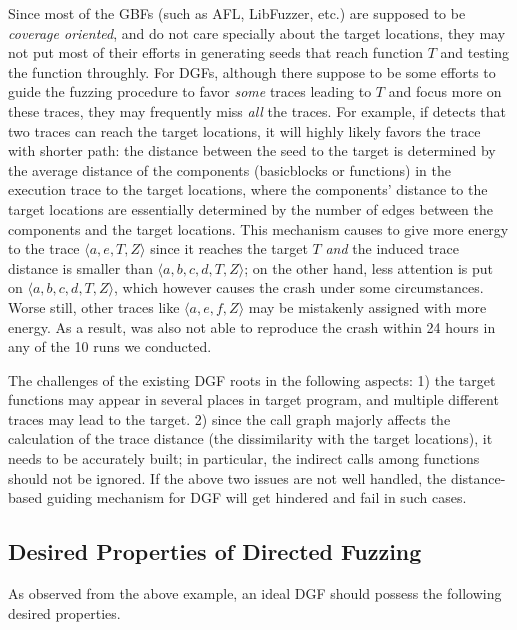 Since most of the GBFs (such as AFL, LibFuzzer, etc.) are supposed to be \emph{coverage oriented}, and do not care specially about the target locations, they may not put most of their efforts in generating seeds that reach function $T$ and testing the function throughly. For DGFs, although there suppose to be some efforts to guide the fuzzing procedure to favor \emph{some} traces leading to $T$ and focus more on these traces, they may frequently miss \emph{all} the traces. For example, if \aflgo detects that two traces can reach the target locations, it will highly likely favors the trace with shorter path: the distance between the seed to the target is determined by the average distance of the components (basicblocks or functions) in the execution trace to the target locations, where the components' distance to the target locations are essentially determined by the number of edges between the components and the target locations. This mechanism causes \aflgo to give more energy to the trace $\langle a, e, T, Z\rangle$ since it reaches the target $T$ \emph{and} the induced trace distance is smaller than $\langle a, b, c, d, T, Z\rangle$; on the other hand, less attention is put on $\langle a, b, c, d, T, Z\rangle$, which however causes the crash under some circumstances. Worse still, other traces like $\langle a, e, f, Z\rangle$ may be mistakenly assigned with more energy. As a result, \aflgo was also not able to reproduce the crash within 24 hours in any of the 10 runs we conducted.
 
The challenges of the existing DGF roots in the following aspects: 1) the target functions may appear in several places in target program, and multiple different traces may lead to the target.  2) since the call graph majorly affects the calculation of the trace distance (the dissimilarity with the target locations), it needs to be accurately built;
in particular, the indirect calls among functions should not be ignored. If the above two issues are not well handled, the distance-based guiding mechanism for DGF will get hindered and fail in such cases.


\subsection{Desired Properties of Directed Fuzzing} \label{subsec:dp}

As observed from the above example, an ideal DGF should possess the following desired properties.

